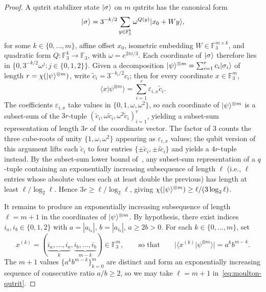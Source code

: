 \documentclass[11pt]{article}
\theoremstyle{definition}
\newcommand{\microspace}{\mspace{0.5mu}}
\newcommand{\ket}[1]{\lvert\microspace #1 \microspace \rangle}
\newcommand{\braket}[2]{\langle #1 | #2 \rangle}
\newcommand{\F}{\mathcal{F}}
\renewcommand{\F}[1]{\mathbb{F}_{#1}}
\newcommand{\chiR}{\chi}
\begin{document}
	\begin{proof}
		A qutrit stabilizer state $\ket\sigma$ on $m$ qutrits has the
		canonical form
		\begin{equation}
			\ket\sigma = 3^{-k/2} \sum_{y \in \F{3}^k}
			\omega^{Q(y)} \ket{x_0 + W y},
		\end{equation}
		for some $k \in \{0, \ldots, m\}$, affine offset $x_0$, isometric
		embedding $W \in \F{3}^{m \times k}$, and quadratic form
		$Q : \F{3}^k \to \F{3}$, with $\omega = e^{2 \pi i / 3}$. Each
		coordinate of $\ket\sigma$ therefore lies in
		$\{0, 3^{-k/2} \omega^j : j \in \{0, 1, 2\}\}$. Given a
		decomposition
		$\ket\psi^{\otimes m} = \sum_{i=1}^r c_i \ket{\sigma_i}$ of length
		$r = \chiR(\ket\psi^{\otimes m})$, write $\tilde c_i = 3^{-k_i/2} c_i$;
		then for every coordinate $x \in \F{3}^m$,
		\begin{equation}\label{eq:coord-subset-sum}
			\braket{x}{\psi^{\otimes m}}
			= \sum_{i = 1}^{r} \varepsilon_{i, x} \tilde c_i.
		\end{equation}
		The coefficients $\varepsilon_{i, x}$ take values in
		$\{0, 1, \omega, \omega^2\}$, so each coordinate of
		$\ket\psi^{\otimes m}$ is a subset-sum of the $3r$-tuple
		$(\tilde c_i, \omega \tilde c_i, \omega^2 \tilde c_i)_{i = 1}^{r}$,
		yielding a subset-sum representation of length $3r$ of the
		coordinate vector. The factor of $3$ counts the three cube-roots of
		unity $\{1, \omega, \omega^2\}$ appearing as $\varepsilon_{i, x}$
		values; the qubit version of this argument lifts each
		$\tilde c_i$ to four entries
		$\{\pm \tilde c_i, \pm i \tilde c_i\}$ and yields a $4r$-tuple
		instead. By the subset-sum lower bound
		of~\cite[Theorem~3.1]{lovitz2022techniques}, any subset-sum
		representation of a $q$-tuple containing an exponentially
		increasing subsequence of length $\ell$ (i.e., $\ell$ entries whose
		absolute values each at least double the previous) has length at
		least $\ell / \log_2 \ell$. Hence $3 r \ge \ell / \log_2 \ell$,
		giving $\chiR(\ket\psi^{\otimes m}) \ge \ell / (3 \log_2 \ell)$.
		
		It remains to produce an exponentially increasing subsequence of
		length $\ell = m + 1$ in the coordinates of $\ket\psi^{\otimes m}$.
		By hypothesis, there exist indices $i_a, i_b \in \{0, 1, 2\}$ with
		$a = |a_{i_a}|$, $b = |a_{i_b}|$, $a \ge 2 b > 0$. For each
		$k \in \{0, \ldots, m\}$, set
		\begin{equation}\label{eq:xk-coord}
			x^{(k)} = (\underbrace{i_a, \ldots, i_a}_{k},			\underbrace{i_b, \ldots, i_b}_{m - k}) \in \F{3}^m,
			\qquad\text{so that}\qquad
			\bigl| \braket{x^{(k)}}{\psi^{\otimes m}} \bigr| = a^k b^{m - k}.
		\end{equation}
		The $m + 1$ values $\{ a^k b^{m - k} \}_{k = 0}^{m}$ are distinct
		and form an exponentially increasing sequence of consecutive ratio
		$a / b \ge 2$, so we may take $\ell = m + 1$
		in~\eqref{eq:moulton-qutrit}.
	\end{proof}
	
\end{document}
